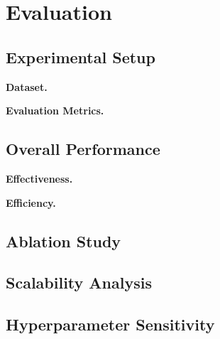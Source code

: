 \section{Evaluation}\label{sec:evaluation}

\subsection{Experimental Setup}\label{setup}

\noindent\textbf{Dataset.}

\noindent\textbf{Evaluation Metrics.}

\subsection{Overall Performance}\label{overall}

\noindent \textbf{Effectiveness.}

\noindent \textbf{Efficiency.}

\subsection{Ablation Study}\label{ablation}

\subsection{Scalability Analysis}\label{scalability}

\subsection{Hyperparameter Sensitivity}\label{sensitivity}